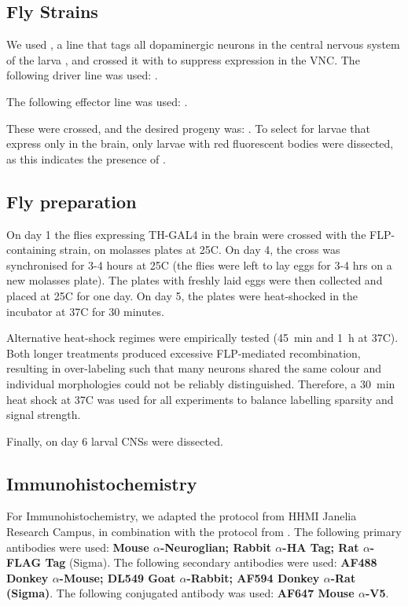     \subsection{Fly Strains}
    We used , a line that tags all dopaminergic neurons in the central nervous system of the larva \citep{selcho2009thgal4}, and crossed it with  to suppress expression in the VNC. 
    The following driver line was used:  
    .

    The following effector line was used:   .

    These were crossed, and the desired progeny was:  . To select for larvae that express  only in the brain, only larvae with red fluorescent bodies were dissected, as this indicates the presence of .  
    
    \subsection{Fly preparation}
    On day 1 the flies expressing TH-GAL4 in the brain were crossed with the FLP-containing strain, on molasses plates at 25\degree C. On day 4, the cross was synchronised for 3-4 hours at 25\degree C (the flies were left to lay eggs for 3-4 hrs on a new molasses plate). The plates with freshly laid eggs were then collected and placed at 25\degree C for one day. On day 5, the plates were heat-shocked in the incubator at 37\degree C for 30 minutes.

    Alternative heat-shock regimes were empirically tested (45~min and 1~h at 37\degree C). Both longer treatments produced excessive FLP-mediated recombination, resulting in over-labeling such that many neurons shared the same colour and individual morphologies could not be reliably distinguished. Therefore, a 30~min heat shock at 37\degree C was used for all experiments to balance labelling sparsity and signal strength.

    Finally, on day 6 larval CNSs were dissected. 

    \subsection{Immunohistochemistry}
        For Immunohistochemistry, we adapted the protocol from HHMI Janelia Research Campus, in combination with the protocol from \citep{nern2015multicolor}. The following primary antibodies were used: \textbf{Mouse $\alpha$-Neuroglian; Rabbit $\alpha$-HA Tag; Rat $\alpha$-FLAG Tag} (Sigma). The following secondary antibodies were used: \textbf{AF488 Donkey $\alpha$-Mouse; DL549 Goat $\alpha$-Rabbit; AF594 Donkey $\alpha$-Rat (Sigma)}. The following conjugated antibody was used: \textbf{AF647 Mouse $\alpha$-V5}. 

